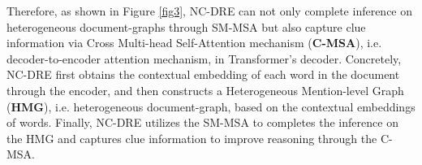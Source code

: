 \documentclass[sigconf,natbib=true]{acmart}
\begin{document}
Therefore, as shown in Figure \ref{fig3}, NC-DRE can not only complete inference on heterogeneous document-graphs through SM-MSA but also capture clue information via Cross Multi-head Self-Attention mechanism (\textbf{C-MSA}), i.e. decoder-to-encoder attention mechanism, in Transformer's decoder.
Concretely, NC-DRE first obtains the contextual embedding of each word in the document through the encoder, and then constructs a Heterogeneous Mention-level Graph (\textbf{HMG}), i.e. heterogeneous document-graph, based on the contextual embeddings of words.
Finally, NC-DRE utilizes the SM-MSA to completes the inference on the HMG and captures clue information to improve reasoning  through the C-MSA.



\end{document}
